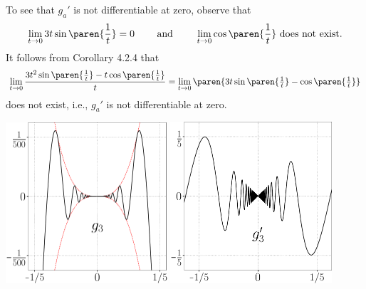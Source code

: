 \documentclass{lew98_solutions}
\begin{document}
\begin{solution}
\begin{enumerate}
        To see that \( g_a' \) is not differentiable at zero, observe that
        \[
            \lim_{t \to 0} 3 t \sin \paren{\frac{1}{t}} = 0 \hspaceand \lim_{t \to 0} \cos \paren{\frac{1}{t}} \text{ does not exist}.
        \]
        It follows from Corollary 4.2.4 that
        \[
            \lim_{t \to 0} \frac{3 t^2 \sin \paren{\tfrac{1}{t}} - t \cos \paren{\tfrac{1}{t}}}{t} = \lim_{t \to 0} \paren{ 3 t \sin \paren{\tfrac{1}{t}} - \cos \paren{\tfrac{1}{t}} }
        \]
        does not exist, i.e., \( g_a' \) is not differentiable at zero.
        \begin{center}
            \includegraphics[width=0.45\textwidth]{UA_Figures/UA_ex5_2_7_fig_3.pdf}
            \hspace{4mm}
            \includegraphics[width=0.45\textwidth]{UA_Figures/UA_ex5_2_7_fig_4.pdf}
        \end{center}


\end{enumerate}
\end{solution}
\end{document}
